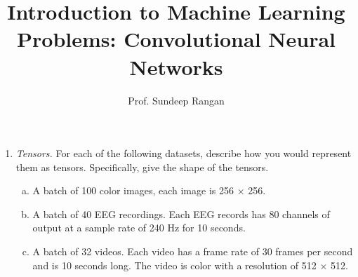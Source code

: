 \documentclass[11pt]{article}
\begin{document}
\title{Introduction to Machine Learning\\
Problems:  Convolutional Neural Networks}
\author{Prof. Sundeep Rangan}
\date{}

\maketitle

\begin{enumerate}

\item \emph{Tensors.}  For each of the following datasets, describe how you
would represent them as tensors.  Specifically, give the shape of the tensors.
\begin{enumerate}[(a)]
\item A batch of 100 color images, each image is 256 $\times$ 256.

\item A batch of 40 EEG recordings.  Each EEG records has 80 channels of output
at a sample rate of 240 Hz for 10 seconds.

\item A batch of 32 videos.  Each video has a frame rate of 30 frames per second
and is 10 seconds long.  The video is color with a resolution of 512 $\times$ 512.
\end{enumerate}



\end{enumerate}
\end{document}
